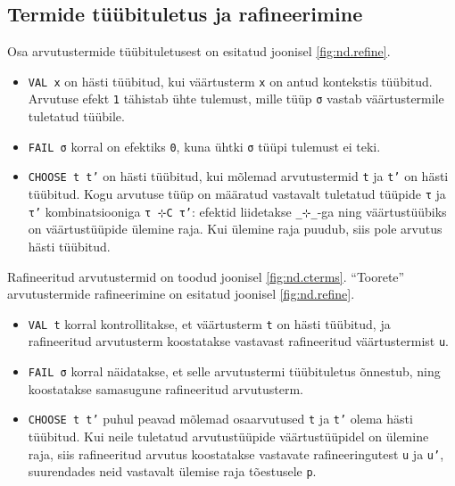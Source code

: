 \documentclass[a4paper,12pt]{article}
\begin{document}
\subsection{Termide tüübituletus ja rafineerimine}

Osa arvutustermide tüübituletusest on esitatud joonisel \ref{fig:nd.refine}.
\begin{itemize}
\item {\tt VAL x} on hästi tüübitud, kui väärtusterm {\tt x} on antud kontekstis tüübitud. Arvutuse efekt {\tt 1} tähistab ühte tulemust, mille tüüp {\tt σ} vastab väärtustermile tuletatud tüübile.
\item {\tt FAIL σ} korral on efektiks {\tt 0}, kuna ühtki {\tt σ} tüüpi tulemust ei teki.
\item {\tt CHOOSE t t'} on hästi tüübitud, kui mõlemad arvutustermid {\tt t} ja {\tt t'} on hästi tüübitud. Kogu arvutuse tüüp on määratud vastavalt tuletatud tüüpide {\tt τ} ja {\tt τ'} kombinatsiooniga {\tt τ ⊹C τ'}: efektid liidetakse {\tt _⊹_}-ga ning väärtustüübiks on väärtustüüpide ülemine raja. Kui ülemine raja puudub, siis pole arvutus hästi tüübitud.
\end{itemize}

Rafineeritud arvutustermid on toodud joonisel \ref{fig:nd.cterms}.
``Toorete'' arvutustermide rafineerimine on esitatud joonisel \ref{fig:nd.refine}.
\begin{itemize}
\item {\tt VAL t} korral kontrollitakse, et väärtusterm {\tt t} on hästi tüübitud, ja rafineeritud arvutusterm koostatakse vastavast rafineeritud väärtustermist {\tt u}.
\item {\tt FAIL σ} korral näidatakse, et selle arvutustermi tüübituletus õnnestub, ning koostatakse samasugune rafineeritud arvutusterm.
\item {\tt CHOOSE t t'} puhul peavad mõlemad osaarvutused {\tt t} ja {\tt t'} olema hästi tüübitud. Kui neile tuletatud arvutustüüpide väärtustüüpidel on ülemine raja, siis rafineeritud arvutus koostatakse vastavate rafineeringutest {\tt u} ja {\tt u'}, suurendades neid vastavalt ülemise raja tõestusele {\tt p}.
\end{itemize}
\end{document}
